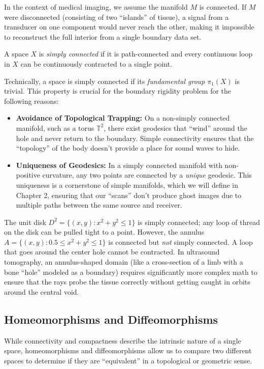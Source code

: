 In the context of medical imaging, we assume the manifold $M$ is connected. If $M$ were disconnected (consisting of two ``islands'' of tissue), a signal from a transducer on one component would never reach the other, making it impossible to reconstruct the full interior from a single boundary data set.

\begin{definition}
  A space $X$ is \emph{simply connected} if it is path-connected and every continuous loop in $X$ can be continuously contracted to a single point.
\end{definition}

Technically, a space is simply connected if its \emph{fundamental group} $\pi_1(X)$ is trivial. This property is crucial for the boundary rigidity problem for the following reasons:

\begin{itemize}
  \item \textbf{Avoidance of Topological Trapping:} On a non-simply connected manifold, such as a torus $\mathbb{T}^2$, there exist geodesics that ``wind'' around the hole and never return to the boundary. Simple connectivity ensures that the ``topology'' of the body doesn't provide a place for sound waves to hide.
  \item \textbf{Uniqueness of Geodesics:} In a simply connected manifold with non-positive curvature, any two points are connected by a \emph{unique} geodesic. This uniqueness is a cornerstone of simple manifolds, which we will define in Chapter 2, ensuring that our ``scans'' don't produce ghost images due to multiple paths between the same source and receiver.
\end{itemize}

\begin{example}
  The unit disk $D^2 = \{(x, y) : x^2 + y^2 \leq 1\}$ is simply connected; any loop of thread on the disk can be pulled tight to a point. However, the annulus $A = \{(x, y) : 0.5 \leq x^2 + y^2 \leq 1\}$ is connected but \emph{not} simply connected. A loop that goes around the center hole cannot be contracted. In ultrasound tomography, an annulus-shaped domain (like a cross-section of a limb with a bone ``hole'' modeled as a boundary) requires significantly more complex math to ensure that the rays probe the tissue correctly without getting caught in orbits around the central void.
\end{example}

\subsection{Homeomorphisms and Diffeomorphisms} While connectivity and compactness describe the intrinsic nature of a single space, homeomorphisms and diffeomorphisms allow us to compare two different spaces to determine if they are ``equivalent'' in a topological or geometric sense.

